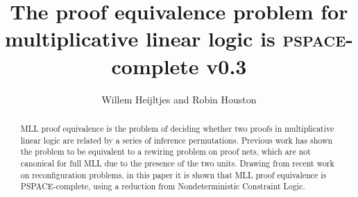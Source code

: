 \documentclass{robinminion}
\author{Willem Heijltjes and Robin Houston}
\title{The proof equivalence problem for multiplicative linear logic is \textsc{pspace}-complete v0.3}
\begin{document}
\maketitle

\begin{abstract}
MLL proof equivalence is the problem of deciding whether two proofs in multiplicative linear logic are related by a series of inference permutations.
%
Previous work has shown the problem to be equivalent to a rewiring problem on proof nets, which are not canonical for full MLL due to the presence of the two units.
%
Drawing from recent work on reconfiguration problems, in this paper it is shown that MLL proof equivalence is PSPACE-complete, using a reduction from Nondeterministic Constraint Logic.
\end{abstract}


%



 
%





\end{document}
